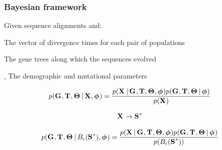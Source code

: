 \begin{frame}
    \frametitle{Bayesian framework}
    Given sequence alignments \alignmentVector and: \\
        \begin{mydescription}
            \item[\divTimeMapVector] The vector of divergence times for each pair of populations
            \item[\geneTreeVector] The gene trees along which the sequences evolved
            \item[\demographicParamVector, \hkyModelVector] The demographic and mutational parameters
        \end{mydescription}
    \begin{displaybox}[8.5cm]
    \[
        p(\geneTreeVector, \divTimeMapVector, \demographicParamVector
        \given
        \alignmentVector, \hkyModelVector) =
        \frac{p(\alignmentVector \given \geneTreeVector, \divTimeMapVector,
        \demographicParamVector, \hkyModelVector)
        p(\geneTreeVector, \divTimeMapVector, \demographicParamVector \given \hkyModelVector)}{
        p(\alignmentVector)}
    \]\vspace{0mm}
    \end{displaybox}
    \smallskip
    \[ \alignmentVector \to \ssVectorObs \]
    \begin{displaybox}[9.5cm]
    \[
        p(\geneTreeVector, \divTimeMapVector, \demographicParamVector
        \given
        \ssSpace, \hkyModelVector) =
        \frac{p(\alignmentVector \given \geneTreeVector, \divTimeMapVector,
        \demographicParamVector, \hkyModelVector)
        p(\geneTreeVector, \divTimeMapVector, \demographicParamVector \given \hkyModelVector)}{
        p(\ssSpace)}
    \]\vspace{0mm}
    \end{displaybox}

\end{frame}

